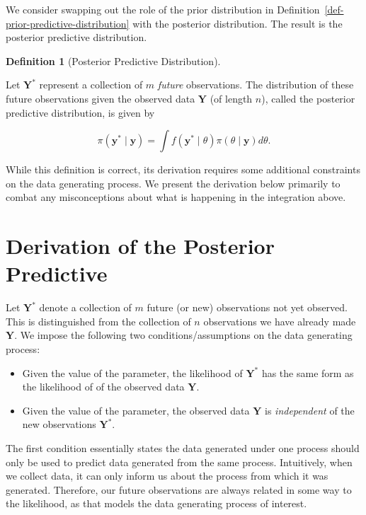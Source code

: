 \documentclass[
  letterpaper,
  DIV=11,
  numbers=noendperiod]{scrreprt}
\providecommand{\tightlist}{%
  \setlength{\itemsep}{0pt}\setlength{\parskip}{0pt}}\usepackage{longtable,booktabs,array}
\theoremstyle{definition}
\theoremstyle{definition}
\newtheorem{definition}{Definition}[chapter]
\theoremstyle{plain}
\theoremstyle{remark}
\begin{document}
We consider swapping out the role of the prior distribution in
Definition~\ref{def-prior-predictive-distribution} with the posterior
distribution. The result is the posterior predictive distribution.

\begin{definition}[Posterior Predictive
Distribution]\protect\hypertarget{def-posterior-predictive-distribution}{}\label{def-posterior-predictive-distribution}

Let \(\mathbf{Y}^*\) represent a collection of \(m\) \emph{future}
observations. The distribution of these future observations given the
observed data \(\mathbf{Y}\) (of length \(n\)), called the posterior
predictive distribution, is given by

\[\pi\left(\mathbf{y}^* \mid \mathbf{y}\right) = \int f\left(\mathbf{y}^* \mid \theta\right) \pi(\theta \mid \mathbf{y}) d\theta.\]

\end{definition}

While this definition is correct, its derivation requires some
additional constraints on the data generating process. We present the
derivation below primarily to combat any misconceptions about what is
happening in the integration above.

\hypertarget{derivation-of-the-posterior-predictive}{%
\section{Derivation of the Posterior
Predictive}\label{derivation-of-the-posterior-predictive}}

Let \(\mathbf{Y}^*\) denote a collection of \(m\) future (or new)
observations not yet observed. This is distinguished from the collection
of \(n\) observations we have already made \(\mathbf{Y}\). We impose the
following two conditions/assumptions on the data generating process:

\begin{itemize}
\tightlist
\item
  Given the value of the parameter, the likelihood of \(\mathbf{Y}^*\)
  has the same form as the likelihood of of the observed data
  \(\mathbf{Y}\).
\item
  Given the value of the parameter, the observed data \(\mathbf{Y}\) is
  \emph{independent} of the new observations \(\mathbf{Y}^*\).
\end{itemize}

The first condition essentially states the data generated under one
process should only be used to predict data generated from the same
process. Intuitively, when we collect data, it can only inform us about
the process from which it was generated. Therefore, our future
observations are always related in some way to the likelihood, as that
models the data generating process of interest.
\end{document}
